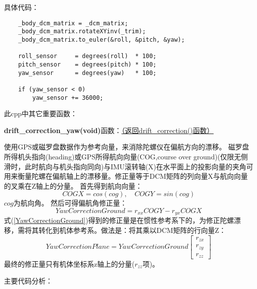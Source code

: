\documentclass[a4paper,10pt]{ctexart} %
\begin{document}
\vspace{8pt}
\noindent 具体代码：
\begin{lstlisting}
    _body_dcm_matrix = _dcm_matrix;
    _body_dcm_matrix.rotateXYinv(_trim);
    _body_dcm_matrix.to_euler(&roll, &pitch, &yaw);

    roll_sensor     = degrees(roll)  * 100;
    pitch_sensor    = degrees(pitch) * 100;
    yaw_sensor      = degrees(yaw)   * 100;

    if (yaw_sensor < 0)
        yaw_sensor += 36000;
\end{lstlisting}

\vspace{20pt}
\noindent 此cpp中其它重要函数：
\vspace{5pt}

\noindent\textbf{drift\_correction\_yaw(void)}函数：\hyperref[drift_correction]{（返回drift\_correction()函数）} \label{drift_correction_yaw}

使用GPS或磁罗盘数据作为参考向量，来消除陀螺仪在偏航方向的漂移。
磁罗盘所得机头指向(heading)或GPS所得航向向量(COG,course over ground)(仅限无侧滑时，此时航向与机头指向同向)与IMU滚转轴(X)在水平面上的投影向量的夹角可用来衡量陀螺在偏航轴上的漂移量。修正量等于DCM矩阵的列向量X与航向向量的叉乘在Z轴上的分量。
首先得到航向向量：
\begin{equation}
COGX=cos(cog),\quad COGY=sin(cog)
\end{equation}
$cog$为航向角。
然后可得偏航角修正量：
\begin{equation}\label{YawCorrectionGround}
YawCorrectionGround=r_{xx}COGY-r_{yx}COGX
\end{equation}
式(\ref{YawCorrectionGround})得到的修正量是在惯性参考系下的，为修正陀螺漂移，需将其转化到机体参考系。做法是：将其乘以DCM矩阵的行向量Z：
\begin{equation}\label{YawCorrectionPlane}
YawCorrectionPlane=YawCorrectionGround
\left[ \begin{array}{c}
r_{zx}\\
r_{zy}\\
r_{zz}
\end{array}\right]
\end{equation}
最终的修正量只有机体坐标系z轴上的分量($r_{zz}项$)。

\vspace{8pt}
\noindent 主要代码分析：
\end{document}
